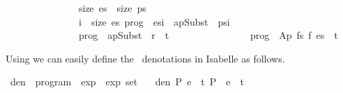 \documentclass{llncs}
\newenvironment{isacode}
{\begin{list}{}{
\setlength{\leftmargin}{4pt}
\setlength{\rightmargin}{0pt}
\setlength{\listparindent}{0pt}\raggedright
\setlength{\itemsep}{0pt}
\setlength{\parsep}{0pt}
\normalfont\ttfamily }\item[]}
{\end{list}}
\begin{document}
\begin{minipage}{\linewidth}
\begin{isacode}
\ \ \ \ \ \ \ \ \ \ \ \ \ \ \ size\ es\ {\isacharequal}\ size\ ps\ {\isacharsemicolon}\isanewline
\ \ \ \ \ \ \ \ \ \ \ \ \ \ \ {\isasymforall}i\ {\isacharless}\ size\ es{\isachardot}\ prog\ {\isasymturnstile}\ es{\isacharbang}i\ {\isasymrightarrow}\ apSubst\ {\isasymtheta}\ {\isacharparenleft}ps{\isacharbang}i{\isacharparenright}{\isacharsemicolon}\isanewline
\ \ \ \ \ \ \ \ \ \ \ \ \ \ \ prog\ {\isasymturnstile}\ apSubst\ {\isasymtheta}\ r\ {\isasymrightarrow}\ t\isanewline
\ \ \ \ \ \ \ \ \ \ \ \ \ \ {\isasymrbrakk}\ {\isasymLongrightarrow}\ prog\ {\isasymturnstile}\ Ap\ {\isacharparenleft}fs\ f{\isacharparenright}\ es\ {\isasymrightarrow}\ t{\isachardoublequoteclose}
\end{isacode}
\end{minipage}


\medskip

\noindent Using  we can easily define the \crwl\ denotations in
Isabelle as follows.



\medskip

\begin{minipage}{\linewidth}
\begin{isacode}
\isamarkupfalse \ den\ {\isacharcolon}{\isacharcolon}\ {\isachardoublequoteopen}program\ {\isasymRightarrow}\ exp\ {\isasymRightarrow}\ exp\ set{\isachardoublequoteclose}\ \isanewline
\ \ {\isachardoublequoteopen}den\ P\ e\ {\isacharequal}\ {\isacharbraceleft}t{\isachardot}\ P\ {\isasymturnstile}\ e\ {\isasymrightarrow}\ t{\isacharbraceright}{\isachardoublequoteclose}\end{isacode}
\end{minipage}
\end{document}
